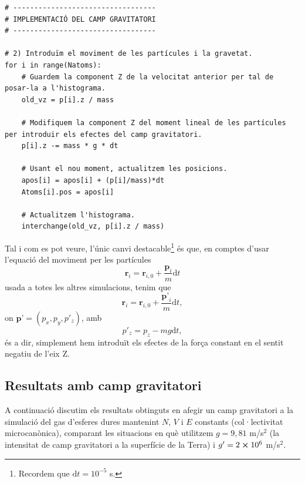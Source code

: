 \documentclass[a4paper,10.5pt]{report}
\begin{document}
\begin{lstlisting}[caption={Introducció del camp gravitatori.}]
# ----------------------------------
# IMPLEMENTACIÓ DEL CAMP GRAVITATORI
# ----------------------------------

# 2) Introduïm el moviment de les partícules i la gravetat.
for i in range(Natoms): 
	# Guardem la component Z de la velocitat anterior per tal de posar-la a l'histograma.
	old_vz = p[i].z / mass  
	
	# Modifiquem la component Z del moment lineal de les partícules per introduir els efectes del camp gravitatori.
	p[i].z -= mass * g * dt 
	
	# Usant el nou moment, actualitzem les posicions.
	apos[i] = apos[i] + (p[i]/mass)*dt
	Atoms[i].pos = apos[i]
	
	# Actualitzem l'histograma.
	interchange(old_vz, p[i].z / mass)	
\end{lstlisting}

Tal i com es pot veure, l'únic canvi destacable\footnote{Recordem que $\mathrm{d}t = 10^{-5}$ s.} és que, en comptes d'usar l'equació del moviment per les partícules
\begin{equation}
	\textbf{r}_i = \textbf{r}_{i,0} + \frac{\textbf{p}_i}{m}\mathrm{d}t
\end{equation}
usada a totes les altres simulacions, tenim que
\begin{equation}
	\textbf{r}_i = \textbf{r}_{i,0} + \frac{\textbf{p'}_i}{m}\mathrm{d}t,
\end{equation}
on $\textbf{p'} = (p_x, p_y, p'_z)$, amb
\begin{equation}
	p'_z = p_z - mg\mathrm{d}t,
\end{equation}
és a dir, simplement hem introduït els efectes de la força constant en el sentit negatiu de l'eix Z.

\subsection{Resultats amb camp gravitatori}
A continuació discutim els resultats obtinguts en afegir un camp gravitatori a la simulació del gas d'esferes dures mantenint $N$, $V$ i $E$ constants (col·lectivitat microcanònica), comparant les situacions en què utilitzem $g = 9,81$ m/s$^2$ (la intensitat de camp gravitatori a la superfície de la Terra) i $g' = 2 \cross 10^6$ m/s$^2$.
\end{document}
